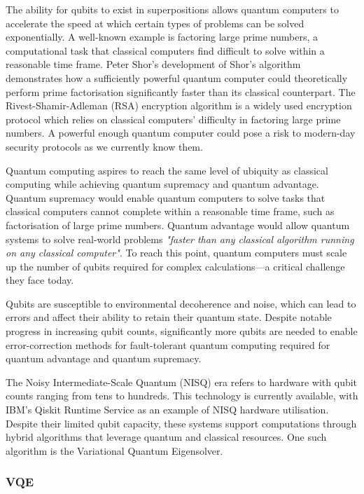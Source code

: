 \documentclass{article}
\begin{document}
{The ability for qubits to exist in superpositions allows quantum computers to accelerate the speed at which certain types of problems can be solved exponentially\cite{knowledgeacademy}. A well-known example is factoring large prime numbers, a computational task that classical computers find difficult to solve within a reasonable time frame. Peter Shor’s development of Shor’s algorithm demonstrates how a sufficiently powerful quantum computer could theoretically perform prime factorisation significantly faster than its classical counterpart\cite{Shor_1997}\cite{minutephysics}. The Rivest-Shamir-Adleman (RSA) encryption algorithm is a widely used encryption protocol which relies on classical computers' difficulty in factoring large prime numbers\cite{encryptionconsulting}. A powerful enough quantum computer could pose a risk to modern-day security protocols as we currently know them. 

Quantum computing aspires to reach the same level of ubiquity as classical computing while achieving quantum supremacy and quantum advantage. Quantum supremacy would enable quantum computers to solve tasks that classical computers cannot complete within a reasonable time frame, such as factorisation of large prime numbers\cite{quera}. Quantum advantage would allow quantum systems to solve real-world problems \textit{"faster than any classical algorithm running on any classical computer"}\cite{quera}. To reach this point, quantum computers must scale up the number of qubits required for complex calculations—a critical challenge they face today.

Qubits are susceptible to environmental decoherence and noise, which can lead to errors and affect their ability to retain their quantum state\cite{futurumcareers}. Despite notable progress in increasing qubit counts, significantly more qubits are needed to enable error-correction methods for fault-tolerant quantum computing required for quantum advantage and quantum supremacy\cite{NewScientist}.

The Noisy Intermediate-Scale Quantum (NISQ) era refers to hardware with qubit counts ranging from tens to hundreds\cite{NISQ}. This technology is currently available, with IBM's Qiskit Runtime Service as an example of NISQ hardware utilisation\cite{ReleaseSummary}. Despite their limited qubit capacity, these systems support computations through hybrid algorithms that leverage quantum and classical resources. One such algorithm is the Variational Quantum Eigensolver.

\subsubsection{VQE}

}
\end{document}
